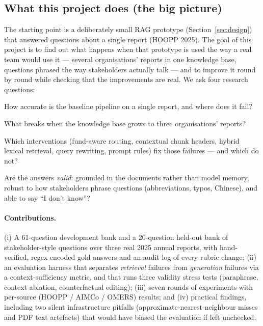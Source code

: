 \documentclass[11pt,a4paper]{article}
\begin{document}
\subsection{What this project does (the big picture)}
The starting point is a deliberately small RAG prototype (Section~\ref{sec:design}) that answered questions about
a single report (HOOPP 2025). The goal of this project is to find out what happens when that prototype is used the
way a real team would use it --- several organisations' reports in one knowledge base, questions phrased the way
stakeholders actually talk --- and to improve it round by round while checking that the improvements are real.
We ask four research questions:
\begin{description}[leftmargin=1.2cm,labelwidth=1cm]
  \item[RQ1] How accurate is the baseline pipeline on a single report, and where does it fail?
  \item[RQ2] What breaks when the knowledge base grows to three organisations' reports?
  \item[RQ3] Which interventions (fund-aware routing, contextual chunk headers, hybrid lexical retrieval, query
             rewriting, prompt rules) fix those failures --- and which do not?
  \item[RQ4] Are the answers \emph{valid}: grounded in the documents rather than model memory, robust to how
             stakeholders phrase questions (abbreviations, typos, Chinese), and able to say ``I don't know''?
\end{description}

\paragraph{Contributions.}
(i) A 61-question development bank and a 20-question held-out bank of stakeholder-style questions over three real
2025 annual reports, with hand-verified, regex-encoded gold answers and an audit log of every rubric change;
(ii) an evaluation harness that separates \emph{retrieval} failures from \emph{generation} failures via a
context-sufficiency metric, and that runs three validity stress tests (paraphrase, context ablation,
counterfactual editing); (iii) seven rounds of experiments with per-source (HOOPP / AIMCo / OMERS) results; and
(iv) practical findings, including two silent infrastructure pitfalls (approximate-nearest-neighbour misses and
PDF text artefacts) that would have biased the evaluation if left unchecked.
\end{document}
